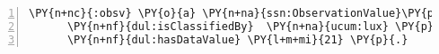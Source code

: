\expandafter\def\csname PY@tok@err\endcsname{}
\begin{Verbatim}[commandchars=\\\{\},numbers=left,firstnumber=1,stepnumber=1]
\PY{n+nc}{:obsv} \PY{o}{a} \PY{n+na}{ssn:ObservationValue}\PY{p}{,} \PY{n+na}{frap:Preference} \PY{p}{;}
      \PY{n+nf}{dul:isClassifiedBy}  \PY{n+na}{ucum:lux} \PY{p}{;}
      \PY{n+nf}{dul:hasDataValue} \PY{l+m+mi}{21} \PY{p}{.}
\end{Verbatim}
